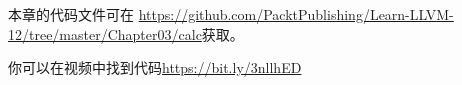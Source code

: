 本章的代码文件可在 \url{https://github.com/PacktPublishing/Learn-LLVM-12/tree/master/Chapter03/calc}获取。\par

你可以在视频中找到代码\url{https://bit.ly/3nllhED}